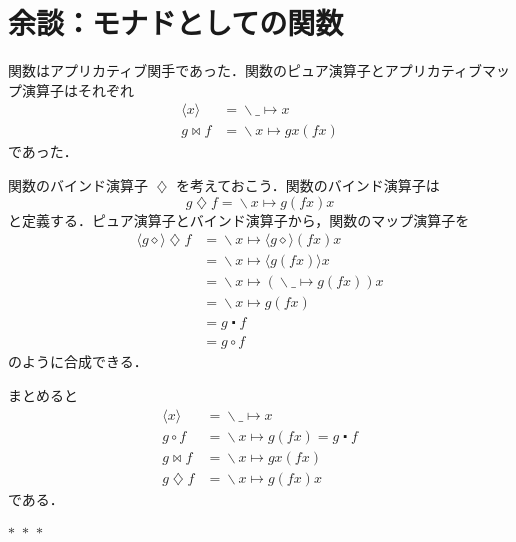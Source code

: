 \documentclass[a5paper,twoside,fleqn,draft]{jsbook}
\newcommand{\separator}{\begin{center}$*$~$*$~$*$\end{center}}
\newcommand{\mAnonParam}{\diamond}
\DeclareMathOperator{\mAppMapFunc}{\bowtie}
\DeclareMathOperator{\mBindFunc}{\diamondsuit}
\DeclareMathOperator{\mCompFunc}{\centerdot}
\DeclareMathOperator{\mLambda}{\backslash}
\DeclareMathOperator{\mLambdaArrow}{\mapsto}
\DeclareMathOperator{\mMapFunc}{\circ}
\newcommand{\mConstWith}[1]{\langle#1\rangle}
\newcommand{\mLambdaEXP}[2]{\mLambda{#1}\mLambdaArrow{#2}} %
\begin{document}
\section{余談：モナドとしての関数}

関数はアプリカティブ関手であった．関数のピュア演算子とアプリカティブマップ演算子はそれぞれ
\begin{align}
\mConstWith{x}&=\mLambdaEXP{\_}{x}\\
g\mAppMapFunc f&=\mLambdaEXP{x}{gx(fx)}
\end{align}
であった．

関数のバインド演算子 $\mBindFunc$ を考えておこう．関数のバインド演算子は
\begin{equation}
g\mBindFunc f=\mLambdaEXP{x}{g(fx)x}
\end{equation}
と定義する．ピュア演算子とバインド演算子から，関数のマップ演算子を
\begin{align}
\mConstWith{g\mAnonParam}\mBindFunc f
&=\mLambdaEXP{x}{\mConstWith{g\mAnonParam}(fx)x}\\
&=\mLambdaEXP{x}{\mConstWith{g(fx)}x}\\
&=\mLambdaEXP{x}{(\mLambdaEXP{\_}{g(fx)})x}\\
&=\mLambdaEXP{x}{g(fx)}\\
&=g\mCompFunc f\\
&=g\mMapFunc f
\end{align}
のように合成できる．

まとめると
\begin{align}
\mConstWith{x}&=\mLambdaEXP{\_}{x}\\
g\mMapFunc f&=\mLambdaEXP{x}{g(fx)}=g\mCompFunc f\\
g\mAppMapFunc f&=\mLambdaEXP{x}{gx(fx)}\\
g\mBindFunc f&=\mLambdaEXP{x}{g(fx)x}
\end{align}
である．


\separator
\end{document}
